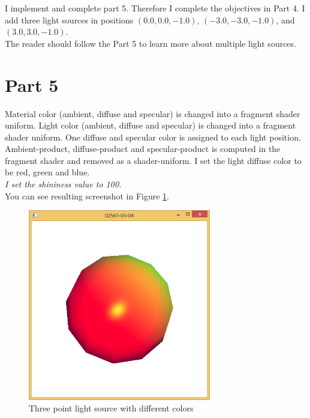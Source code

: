 I implement and complete part 5. Therefore I complete the objectives in Part 4. 
I add three light sources in positions $( 0.0, 0.0, -1.0)$, $( -3.0, -3.0, -1.0)$, and $(3.0, 3.0, -1.0)$. \\

The reader should follow the Part 5 to learn more about multiple light sources.

\section{Part 5}
\label{del-5}

Material color (ambient, diffuse and specular) is changed into a fragment shader uniform. Light color (ambient, diffuse and specular) is changed into a fragment shader uniform. One diffuse and specular color is assigned to each light position. Ambient-product, diffuse-product and specular-product is computed in the fragment shader and removed as a shader-uniform. I set the light diffuse color to be red, green and blue.\\
\emph{I set the shininess value to 100.} \\
You can see resulting screenshot in Figure \ref{fig:4-5}.


\begin{figure}[hp]
\centering
\includegraphics[width=8cm]{../Screenshots/ex-4/4.png}
\caption{Three point light source with different colors}
\label{fig:4-5}
\end{figure}
